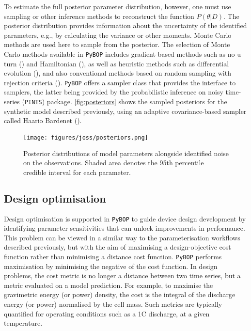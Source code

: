 \documentclass[
]{article}
\begin{document}
To estimate the full posterior parameter distribution, however, one must
use sampling or other inference methods to reconstruct the function
\(P(\theta|D)\). The posterior distribution provides information about
the uncertainty of the identified parameters, e.g., by calculating the
variance or other moments. Monte Carlo methods are used here to sample
from the posterior. The selection of Monte Carlo methods available in
\texttt{PyBOP} includes gradient-based methods such as no-u-turn
() and Hamiltonian
(), as well as
heuristic methods such as differential evolution
(), and also conventional
methods based on random sampling with rejection criteria
().
\texttt{PyBOP} offers a sampler class that provides the interface to
samplers, the latter being provided by the probabilistic inference on
noisy time-series (\texttt{PINTS}) package. \autoref{fig:posteriors}
shows the sampled posteriors for the synthetic model described
previously, using an adaptive covariance-based sampler called Haario
Bardenet ().

\begin{figure}
\centering
\texttt{[image: figures/joss/posteriors.png]}
\caption{Posterior distributions of model parameters alongside
identified noise on the observations. Shaded area denotes the 95th
percentile credible interval for each parameter. \label{fig:posteriors}}
\end{figure}

\subsection{Design optimisation}\label{design-optimisation}

Design optimisation is supported in \texttt{PyBOP} to guide device
design development by identifying parameter sensitivities that can
unlock improvements in performance. This problem can be viewed in a
similar way to the parameterisation workflows described previously, but
with the aim of maximising a design-objective cost function rather than
minimising a distance cost function. \texttt{PyBOP} performs
maximisation by minimising the negative of the cost function. In design
problems, the cost metric is no longer a distance between two time
series, but a metric evaluated on a model prediction. For example, to
maximise the gravimetric energy (or power) density, the cost is the
integral of the discharge energy (or power) normalised by the cell mass.
Such metrics are typically quantified for operating conditions such as a
1C discharge, at a given temperature.
\end{document}
